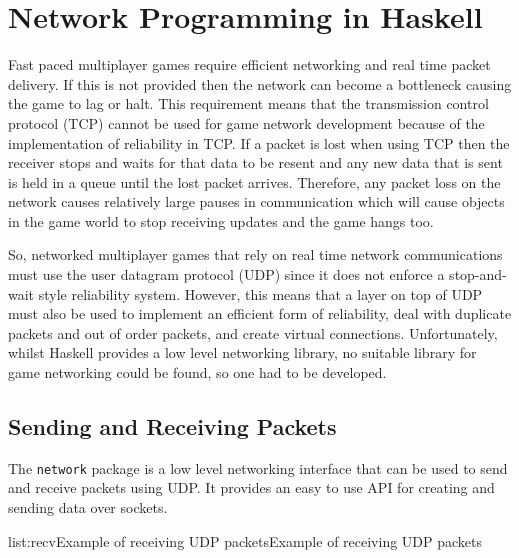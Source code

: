 \section{Network Programming in Haskell}

Fast paced multiplayer games require efficient networking and real time packet delivery.
If this is not provided then the network can become a bottleneck causing the game to
lag or halt. This requirement means that the transmission control protocol (TCP) cannot
be used for game network development because of the implementation of reliability
in TCP. If a packet is lost when using TCP then the receiver stops and waits for that
data to be resent and any new data that is sent is held in a queue until the lost packet
arrives. Therefore, any packet loss on the network causes relatively large pauses in
communication which will cause objects in the game world to stop receiving updates and
the game hangs too.

So, networked multiplayer games that rely on real time network communications must use
the user datagram protocol (UDP) since it does not enforce a stop-and-wait style reliability system.
However, this means that a layer on top of UDP must also be used to implement an efficient
form of reliability, deal with duplicate packets and out of order packets, and create virtual
connections. Unfortunately, whilst Haskell provides a low level networking library, no suitable
library for game networking could be found, so one had to be developed. %

\subsection{Sending and Receiving Packets}

The \texttt{network} package is a low level networking interface that can be used to
send and receive packets using UDP.
It provides an easy to use API for creating and sending data over sockets.

\vspace{-0.5em}
\begin{listing}{list:recv}{Example of receiving UDP packets}{Example of receiving UDP packets}{}
\end{listing}\vspace{-1.5em}

